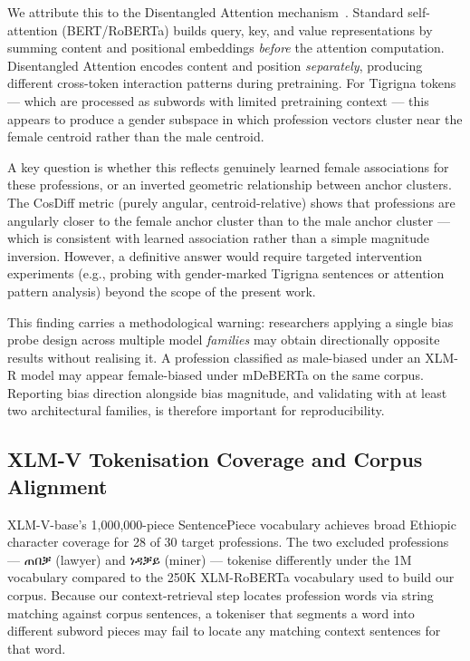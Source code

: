 \documentclass[11pt,a4paper]{article}
\begin{document}
We attribute this to the Disentangled Attention mechanism~\cite{he2021deberta}.
Standard self-attention (BERT/RoBERTa) builds query, key, and value
representations by summing content and positional embeddings \emph{before}
the attention computation. Disentangled Attention encodes content and position
\emph{separately}, producing different cross-token interaction patterns during
pretraining. For Tigrigna tokens — which are processed as subwords with limited
pretraining context — this appears to produce a gender subspace in which
profession vectors cluster near the female centroid rather than the male centroid.

A key question is whether this reflects genuinely learned female associations
for these professions, or an inverted geometric relationship between anchor
clusters. The CosDiff metric (purely angular, centroid-relative) shows that
professions are angularly closer to the female anchor cluster than to the male
anchor cluster — which is consistent with learned association rather than a
simple magnitude inversion. However, a definitive answer would require targeted
intervention experiments (e.g., probing with gender-marked Tigrigna sentences
or attention pattern analysis) beyond the scope of the present work.

This finding carries a methodological warning: researchers applying a single
bias probe design across multiple model \emph{families} may obtain
directionally opposite results without realising it. A profession classified
as male-biased under an XLM-R model may appear female-biased under mDeBERTa
on the same corpus. Reporting bias direction alongside bias magnitude, and
validating with at least two architectural families, is therefore important
for reproducibility.

\subsection{XLM-V Tokenisation Coverage and Corpus Alignment}

XLM-V-base's 1{,}000{,}000-piece SentencePiece vocabulary achieves broad
Ethiopic character coverage for 28 of 30 target professions. The two excluded
professions — {\ethiopicfont ጠበቓ} (lawyer) and {\ethiopicfont ነዳቓይ} (miner) — tokenise
differently under the 1M vocabulary compared to the 250K XLM-RoBERTa vocabulary
used to build our corpus. Because our context-retrieval step locates profession
words via string matching against corpus sentences, a tokeniser that segments a
word into different subword pieces may fail to locate any matching context
sentences for that word.
\end{document}

